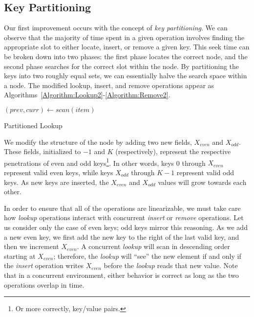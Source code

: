 \documentclass{llncs}
\begin{document}
{\subsection{Key Partitioning}

Our first improvement occurs with the concept of {\em key partitioning}.  We can observe that the majority of time spent in a given operation involves finding the appropriate slot to either locate, insert, or remove a given key.  This seek time can be broken down into two phases: the first phase locates the correct node, and the second phase searches for the correct slot within the node.  By partitioning the keys into two roughly equal sets, we can essentially halve the search space within a node.  The modified lookup, insert, and remove operations appear as Algorithms~\ref{Algorithm:Lookup2}-\ref{Algorithm:Remove2}.

\begin{algorithm}
\setcounter{AlgoLine}{0}
\DontPrintSemicolon
{} {
    $(prev,curr) \leftarrow scan(item)$ \;
     
     \;
}
\caption{Partitioned Lookup}
\label{Algorithm:Lookup2}
\end{algorithm}

We modify the structure of the node by adding two new fields, $X_{even}$ and $X_{odd}$.  These fields, initialized to $-1$ and $K$ (respectively), represent the respective penetrations of even and odd keys\footnote{Or more correctly, key/value pairs.}.  In other words, keys 0 through $X_{even}$ represent valid even keys, while keys $X_{odd}$ through $K-1$ represent valid odd keys.  As new keys are inserted, the $X_{even}$ and $X_{odd}$ values will grow towards each other.

In order to ensure that all of the operations are linearizable, we must take care how {\em lookup} operations interact with concurrent {\em insert} or {\em remove} operations.  Let us consider only the case of even keys; odd keys mirror this reasoning.  As we add a new even key, we first add the new key to the right of the last valid key, and then we increment $X_{even}$.  A concurrent {\em lookup} will scan in descending order starting at $X_{even}$; therefore, the {\em lookup} will ``see'' the new element if and only if the {\em insert} operation writes $X_{even}$ before the {\em lookup} reads that new value.  Note that in a concurrent environment, either behavior is correct as long as the two operations overlap in time.

}
\end{document}
